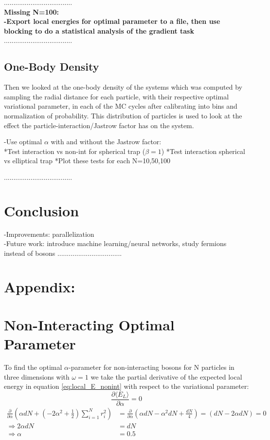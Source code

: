 \documentclass[12pt,a4paper,english]{article}
\begin{document}
....................................\\
\textbf{Missing N=100:\\
-Export local energies for optimal parameter to a file, then use blocking to do a statistical analysis of the gradient task\\}
....................................

\subsection{One-Body Density}
\label{subsect:Result_onbody}
Then we looked at the one-body density of the systems which was computed by sampling the radial distance for each particle, with their respective optimal variational parameter, in each of the MC cycles after calibrating into bins and normalization of probability. This distribution of particles is used to look at the effect the particle-interaction/Jastrow factor has on the system.

-Use optimal $\alpha$ with and without the Jastrow factor:\\
     *Test interaction vs non-int for spherical trap ($\beta=1$)
     *Test interaction spherical vs elliptical trap
     *Plot these tests for each N=10,50,100
     

....................................
\section{Conclusion}
\label{sect:Conclusion}
-Improvements: parallelization\\
-Future work: introduce machine learning/neural networks, study fermions instead of bosons
..................................

\appendix
\section*{Appendix:}
\section{Non-Interacting Optimal Parameter}
\label{appendix:Optimal_alpha}
To find the optimal $\alpha$-parameter for non-interacting bosons for N particles in three dimensions with $\omega=1$ we take the partial derivative of the expected local energy in equation \ref{eq:local_E_nonint} with respect to the variational parameter:
\[\frac{\partial \langle E_L\rangle}{\partial \alpha}=0\]
\begin{align*}
\frac{\partial}{\partial \alpha}\left(\alpha dN+(-2\alpha^2+\frac{1}{2})\sum_{i=1}^{N}r_i^2\right)&=\frac{\partial}{\partial \alpha}\left(\alpha dN-\alpha^2dN+\frac{dN}{4}\right)=(dN-2\alpha dN)=0\\
\Rightarrow 2\alpha dN&=dN\\
\Rightarrow \alpha&=0.5
\end{align*}
\end{document}
